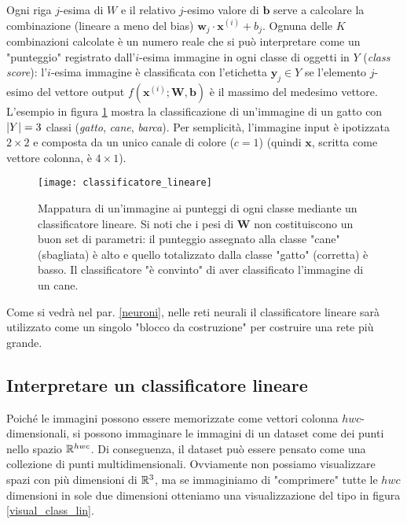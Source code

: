 Ogni riga $j$-esima di $W$ e il relativo $j$-esimo valore di $\mathbf{b}$ serve a calcolare la combinazione (lineare a meno del bias) $\mathbf{w}_j\cdot \mathbf{x}^{(i)}+b_j$. Ognuna delle $K$ combinazioni calcolate è un numero reale che si può interpretare come un "punteggio" registrato dall'$i$-esima immagine in ogni classe di oggetti in $Y$ (\textit{class score}): l'$i$-esima immagine è classificata con l'etichetta $\mathbf{y}_j\in Y$ se l'elemento $j$-esimo del vettore output $f(\mathbf{x}^{(i)};\mathbf{W},\mathbf{b})$ è il massimo del medesimo vettore.\\

L'esempio in figura \ref{class_lin} mostra la classificazione di un'immagine di un gatto con $\left|Y\right|=3$ classi (\textit{gatto}, \textit{cane}, \textit{barca}). Per semplicità, l'immagine input è ipotizzata $2\times 2$ e composta da un unico canale di colore ($c=1$) (quindi $\mathbf{x}$, scritta come vettore colonna, è $4\times 1$).

\begin{figure}[h!]
\centering
\texttt{[image: classificatore\_lineare]}
\caption{Mappatura di un'immagine ai punteggi di ogni classe mediante un classificatore lineare. Si noti che i pesi di $\mathbf{W}$ non costituiscono un buon set di parametri: il punteggio assegnato alla classe "cane" (sbagliata) è alto e quello totalizzato dalla classe "gatto" (corretta) è basso. Il classificatore "è convinto" di aver classificato l'immagine di un cane.}
\label{class_lin}
\end{figure}

Come si vedrà nel par. \ref{neuroni}, nelle reti neurali il classificatore lineare sarà utilizzato come un singolo "blocco da costruzione" per costruire una rete più grande.

\subsection*{Interpretare un classificatore lineare}

Poiché le immagini possono essere memorizzate come vettori colonna $hwc$-dimensionali, si possono immaginare le immagini di un dataset come dei punti nello spazio $\mathbb{R}^{hwc}$. Di conseguenza, il dataset può essere pensato come una collezione di punti multidimensionali. Ovviamente non possiamo visualizzare spazi con più dimensioni di $\mathbb{R}^{3}$, ma se immaginiamo di "comprimere" tutte le $hwc$ dimensioni in sole due dimensioni otteniamo una visualizzazione del tipo in figura \ref{visual_class_lin}.

